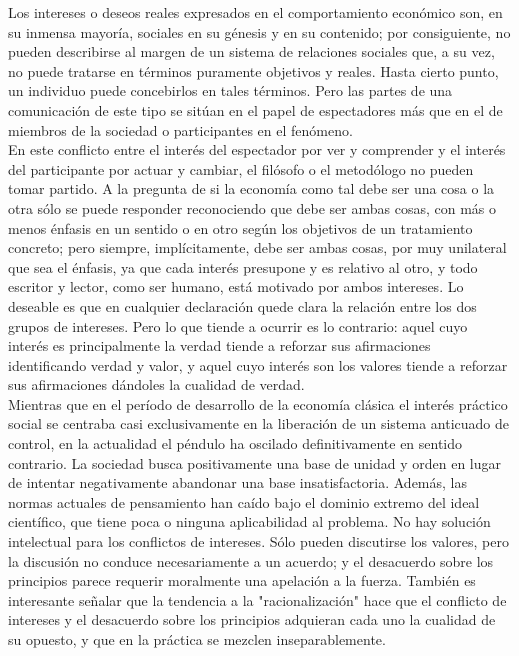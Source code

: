 Los intereses o deseos reales expresados en el comportamiento económico son, en su inmensa mayoría, sociales en su génesis y en su contenido; por consiguiente, no pueden describirse al margen de un sistema de relaciones sociales que, a su vez, no puede tratarse en términos puramente objetivos y reales. Hasta cierto punto, un individuo puede concebirlos en tales términos. Pero las partes de una comunicación de este tipo se sitúan en el papel de espectadores más que en el de miembros de la sociedad o participantes en el fenómeno. \\
En este conflicto entre el interés del espectador por ver y comprender y el interés del participante por actuar y cambiar, el filósofo o el metodólogo no pueden tomar partido. A la pregunta de si la economía como tal debe ser una cosa o la otra sólo se puede responder reconociendo que debe ser ambas cosas, con más o menos énfasis en un sentido o en otro según los objetivos de un tratamiento concreto; pero siempre, implícitamente, debe ser ambas cosas, por muy unilateral que sea el énfasis, ya que cada interés presupone y es relativo al otro, y todo escritor y lector, como ser humano, está motivado por ambos intereses. Lo deseable es que en cualquier declaración quede clara la relación entre los dos grupos de intereses. Pero lo que tiende a ocurrir es lo contrario: aquel cuyo interés es principalmente la verdad tiende a reforzar sus afirmaciones identificando verdad y valor, y aquel cuyo interés son los valores tiende a reforzar sus afirmaciones dándoles la cualidad de verdad.\\

Mientras que en el período de desarrollo de la economía clásica el interés práctico social se centraba casi exclusivamente en la liberación de un sistema anticuado de control, en la actualidad el péndulo ha oscilado definitivamente en sentido contrario. La sociedad busca positivamente una base de unidad y orden en lugar de intentar negativamente abandonar una base insatisfactoria. Además, las normas actuales de pensamiento han caído bajo el dominio extremo del ideal científico, que tiene poca o ninguna aplicabilidad al problema. No hay solución intelectual para los conflictos de intereses. Sólo pueden discutirse los valores, pero la discusión no conduce necesariamente a un acuerdo; y el desacuerdo sobre los principios parece requerir moralmente una apelación a la fuerza. También es interesante señalar que la tendencia a la "racionalización" hace que el conflicto de intereses y el desacuerdo sobre los principios adquieran cada uno la cualidad de su opuesto, y que en la práctica se mezclen inseparablemente.\\

